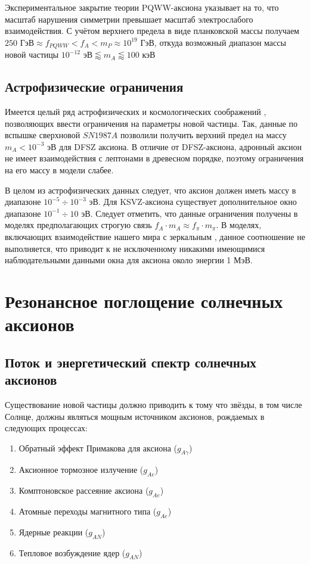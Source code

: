 \documentclass[a4paper,article,14pt]{extarticle}
\begin{document}
Экспериментальное закрытие теории PQWW-аксиона указывает на то, что масштаб нарушения симметрии превышает масштаб электрослабого взаимодействия. С учётом верхнего предела в виде планковской массы получаем $250 \text{ ГэВ} \approx f_{PQWW} < f_A < m_P \approx 10^{19} \text{ ГэВ} $, откуда возможный диапазон массы новой частицы $ 10^{-12} \text{ эВ} \lessapprox m_A \lessapprox 100 \text{ кэВ} $

\subsection{Астрофизические ограничения}

Имеется целый ряд астрофизических и космологических соображений \cite{turner1990windows, Raffelt:1995ym, raffelt1990astrophysical}, позволяющих ввести ограничения на параметры новой частицы. Так, данные по вспышке сверхновой $SN1987A$ позволили получить верхний предел на массу $m_A < 10^{-3} \text{ эВ}$ для DFSZ аксиона. В отличие от DFSZ-аксиона, адронный аксион не имеет взаимодействия с лептонами в древесном порядке, поэтому ограничения на его массу в модели слабее. 

В целом из астрофизических данных следует, что аксион должен иметь массу в диапазоне $10^{-5} \div 10^{-3} \text{ эВ}$. Для KSVZ-аксиона существует дополнительное окно диапазоне $10^{-1} \div 10 \text{ эВ}$. Следует отметить, что данные ограничения получены в моделях предполагающих строгую связь $f_A \cdot m_A \approx f_{\pi} \cdot m_{\pi}$. В моделях, включающих взаимодействие нашего мира с зеркальным \cite{berezhiani2001strong}, данное соотношение не выполняется, что приводит к не исключенному никакими имеющимися наблюдательными данными окна для аксиона около энергии 1 МэВ.

\newpage

\section{Резонансное поглощение солнечных аксионов}

\subsection{Поток и энергетический спектр солнечных аксионов}

Существование новой частицы должно приводить к тому что звёзды, в том числе Солнце, должны являться мощным источником аксионов, рождаемых в следующих процессах:

\begin{enumerate}
    \item Обратный эффект Примакова для аксиона ($g_{A\gamma}$)
    \item Аксионное тормозное излучение ($g_{Ae}$)
    \item Комптоновское рассеяние аксиона ($g_{Ae}$)
    \item Атомные переходы магнитного типа ($g_{Ae}$)
    \item Ядерные реакции ($g_{AN}$)
    \item Тепловое возбуждение ядер ($g_{AN}$)
\end{enumerate}
\end{document}
